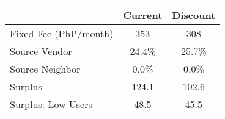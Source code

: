 \begin{tabular}{lcc}
\hline
& Current & Discount \\
\hline
\hline
Fixed Fee (PhP/month) &353&308\\
Source Vendor &24.4\% &25.7\% \\
Source Neighbor &0.0\% &0.0\% \\
 Surplus  &124.1&102.6 \\
 Surplus: Low Users  &48.5&45.5 \\
\hline
\end{tabular}
